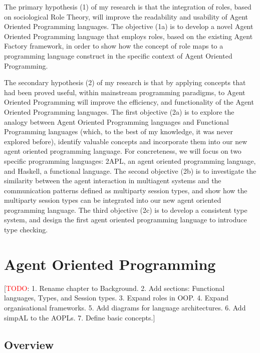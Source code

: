 \documentclass[a4paper,12pt,oneside,fleqn]{book} %
\newcommand{\rg}[1]{\marginpar{\tiny\raggedright\textcolor{blue}{\bf rg:} #1}}
\newcommand{\todo}[1]{[\textcolor{red}{TODO}: #1]}
\renewcommand{\rg}{}
\begin{document}
The primary hypothesis (1) of my research is that the integration of roles,
based on sociological Role Theory, will improve the readability and
usability of Agent Oriented Programming languages. The objective (1a) is to
develop a novel Agent Oriented Programming language that employs roles,
based on the existing Agent Factory framework, in order to show how the
concept of role maps to a programming language construct in the specific
context of Agent Oriented Programming.

The secondary hypothesis (2) of my research is that by applying concepts
that had been proved useful, within mainstream programming paradigms, to
Agent Oriented Programming will improve the efficiency, and functionality
of the Agent Oriented Programming languages. The first objective (2a) is to
explore the analogy between Agent Oriented Programming languages and
Functional Programming languages (which, to the best of my knowledge, it
was never explored before), identify valuable concepts and incorporate them
into our new agent oriented programming language. For concreteness, we will
focus on two specific programming languages: 2APL, an agent oriented
programming language, and Haskell, a functional language. The second
objective (2b) is to investigate the similarity between the agent
interaction in multiagent systems and the communication patterns defined as
multiparty session types, and show how the multiparty session types can be
integrated into our new agent oriented programming language. The third
objective (2c) is to develop a consistent type system, and design the first
agent oriented programming language to introduce type checking.



\chapter{Agent Oriented Programming}\label{ch:aop} %
\todo{1. Rename chapter to Background. 2. Add sections: Functional languages,
Types, and Session types. 3. Expand roles in OOP. 4. Expand organisational
frameworks. 5. Add diagrams for
language architectures. 6. Add simpAL to the AOPLs. 7. Define basic
concepts.}
\section{Overview} %
\end{document}
